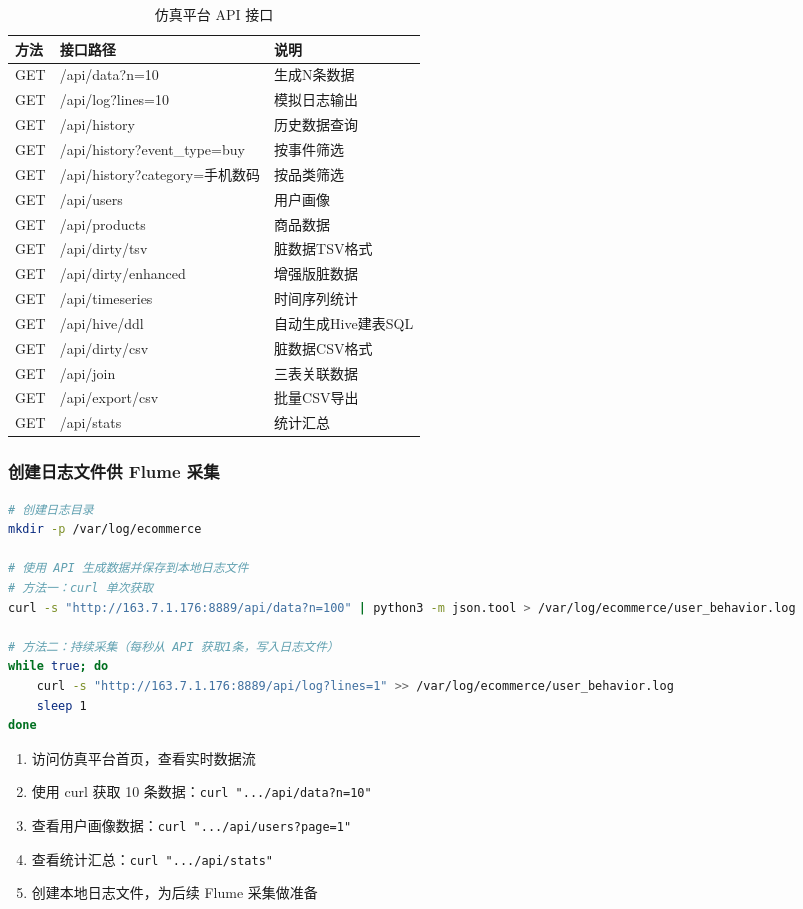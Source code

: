 \documentclass[12pt,a4paper]{article}
\begin{document}
\begin{table}[H]
\centering
\caption{仿真平台 API 接口}
{\footnotesize
\begin{tabular}{lll}
\toprule
\textbf{方法} & \textbf{接口路径} & \textbf{说明} \\
\midrule
GET & /api/data?n=10 & 生成N条数据 \\
GET & /api/log?lines=10 & 模拟日志输出 \\
GET & /api/history & 历史数据查询 \\
GET & /api/history?event\_type=buy & 按事件筛选 \\
GET & /api/history?category=手机数码 & 按品类筛选 \\
GET & /api/users & 用户画像 \\
GET & /api/products & 商品数据 \\
GET & /api/dirty/tsv & 脏数据TSV格式 \\
GET & /api/dirty/enhanced & 增强版脏数据 \\
GET & /api/timeseries & 时间序列统计 \\
GET & /api/hive/ddl & 自动生成Hive建表SQL \\
GET & /api/dirty/csv & 脏数据CSV格式 \\
GET & /api/join & 三表关联数据 \\
GET & /api/export/csv & 批量CSV导出 \\
GET & /api/stats & 统计汇总 \\
\bottomrule
\end{tabular}
}
\end{table}

\subsubsection{创建日志文件供 Flume 采集}

\begin{lstlisting}[language=bash]
# 创建日志目录
mkdir -p /var/log/ecommerce

# 使用 API 生成数据并保存到本地日志文件
# 方法一：curl 单次获取
curl -s "http://163.7.1.176:8889/api/data?n=100" | python3 -m json.tool > /var/log/ecommerce/user_behavior.log

# 方法二：持续采集（每秒从 API 获取1条，写入日志文件）
while true; do
    curl -s "http://163.7.1.176:8889/api/log?lines=1" >> /var/log/ecommerce/user_behavior.log
    sleep 1
done
\end{lstlisting}

\begin{practicebox}[动手练习]
\begin{enumerate}
    \item 访问仿真平台首页，查看实时数据流
    \item 使用 curl 获取 10 条数据：\texttt{curl ".../api/data?n=10"}
    \item 查看用户画像数据：\texttt{curl ".../api/users?page=1"}
    \item 查看统计汇总：\texttt{curl ".../api/stats"}
    \item 创建本地日志文件，为后续 Flume 采集做准备
\end{enumerate}
\end{practicebox}
\end{document}

